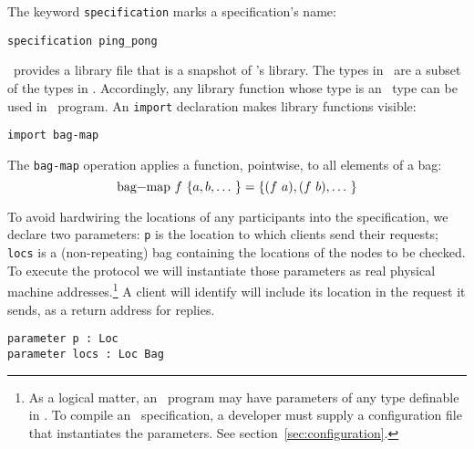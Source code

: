 \documentclass[final]{article}
\newcommand{\listinline}[1]{\text{\lstinline{#1}}}
\begin{document}

The keyword \lstinline{specification} marks a specification's name:
\begin{emlcode}
\begin{lstlisting}
specification ping_pong
\end{lstlisting}
\end{emlcode}



\eml\ provides a library file that is a snapshot of \nuprl's library.
The types in \eml\ are a subset of the types in \nuprl.  Accordingly,
any library function whose type is an \eml\ type can be used in
\eml\ program.  An \lstinline{import} declaration makes library
functions visible:
\begin{emlcode}
\begin{lstlisting}
import bag-map
\end{lstlisting}
\end{emlcode}
The \lstinline{bag-map} operation applies a function, pointwise, to
all elements of a bag:
\[
    \listinline{bag-map}~f~\{a,b,\ldots~\} = \{(f~a), (f~b), \ldots~\}
\]


To avoid hardwiring the locations of any participants into the
specification, we declare two parameters: \lstinline{p} is the
location to which clients send their requests; \lstinline{locs} is a
(non-repeating) bag containing the locations of the nodes to be
checked.  To execute the protocol we will instantiate those parameters
as real physical machine addresses.\footnote{As a logical matter, an
  \eml\ program may have parameters of any type definable in \eml.  To
  compile an \eml\ specification, a developer must supply a
  configuration file that instantiates the parameters.  See
  section~\ref{sec:configuration}.}  A client will identify
will include its location in the request it sends, as a return address
for replies.
\begin{emlcode}
\begin{lstlisting}
parameter p : Loc
parameter locs : Loc Bag
\end{lstlisting}
\end{emlcode}

\end{document}
